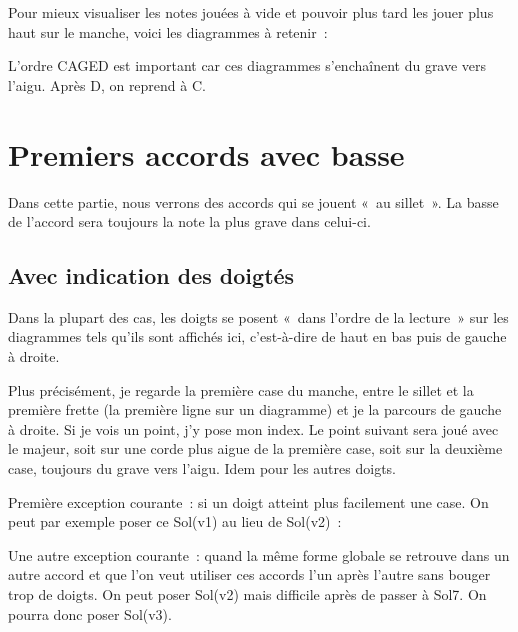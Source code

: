 \documentclass[11pt]{article}
\begin{document}
Pour mieux visualiser les notes jouées à vide et pouvoir plus tard les
jouer plus haut sur le manche, voici les diagrammes à retenir :


L’ordre CAGED est important car ces diagrammes s’enchaînent du grave vers
l’aigu. Après D, on reprend à C.

\section{Premiers accords avec basse} \label{premiers}

Dans cette partie, nous verrons des accords qui se jouent «~au sillet~».
La basse de l’accord sera toujours la note la plus grave dans celui-ci.

\subsection{Avec indication des doigtés}

Dans la plupart des cas, les doigts se posent «~dans l’ordre de la lecture~»
sur les diagrammes tels qu’ils sont affichés ici, c’est-à-dire de haut en bas
puis de gauche à droite. 


Plus précisément, je regarde la première case du manche, entre le sillet
et la première frette (la première ligne sur un
diagramme) et je la parcours de gauche à droite. Si je vois un point,
j’y pose mon index. Le point suivant sera joué avec le majeur, soit
sur une corde plus aigue de la première case, soit sur la deuxième case,
toujours du grave vers l’aigu. Idem pour les autres doigts.

Première exception courante~: si un doigt atteint plus facilement une case.
On peut par exemple poser ce Sol(v1) au lieu de Sol(v2)~:


Une autre exception courante~: quand la même forme globale se retrouve dans un
autre accord et que l’on veut utiliser ces accords l’un après l’autre sans
bouger trop de doigts. On peut poser Sol(v2) mais difficile après de passer à
Sol7. On pourra donc poser Sol(v3).

\end{document}
